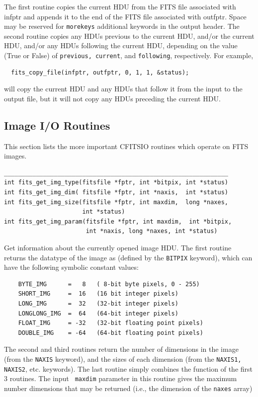 \documentclass[11pt]{article}
\begin{document}
The first routine copies the current HDU from the FITS file associated
with infptr and appends it to the end of the FITS file associated with
outfptr.  Space may be reserved for {\tt morekeys} additional keywords
in the output header.   The second routine copies any HDUs previous
to the current HDU, and/or the current HDU, and/or any HDUs following the
current HDU, depending on the value (True or False) of {\tt previous,
current}, and {\tt following}, respectively.  For example,
\begin{verbatim}
  fits_copy_file(infptr, outfptr, 0, 1, 1, &status);
\end{verbatim}
will copy the current HDU and any HDUs that follow it from the input
to the output file, but it will not copy any HDUs preceding the 
current HDU.


\newpage
\subsection{Image I/O Routines}

This section lists the more important CFITSIO routines which operate on
FITS images.

\begin{verbatim}
_______________________________________________________________
int fits_get_img_type(fitsfile *fptr, int *bitpix, int *status)
int fits_get_img_dim( fitsfile *fptr, int *naxis,  int *status)
int fits_get_img_size(fitsfile *fptr, int maxdim,  long *naxes,
                      int *status)
int fits_get_img_param(fitsfile *fptr, int maxdim,  int *bitpix,
                       int *naxis, long *naxes, int *status)
\end{verbatim}

Get information about the currently opened image HDU. The first routine
returns the datatype of the image as (defined by the {\tt BITPIX}
keyword), which can have the following symbolic constant values: 
\begin{verbatim}
    BYTE_IMG      =   8   ( 8-bit byte pixels, 0 - 255)
    SHORT_IMG     =  16   (16 bit integer pixels)
    LONG_IMG      =  32   (32-bit integer pixels)
    LONGLONG_IMG  =  64   (64-bit integer pixels)
    FLOAT_IMG     = -32   (32-bit floating point pixels)
    DOUBLE_IMG    = -64   (64-bit floating point pixels)
\end{verbatim}

The second and third routines return the number of dimensions in the
image (from the {\tt NAXIS} keyword), and the sizes of each dimension
(from the {\tt NAXIS1, NAXIS2}, etc. keywords).  The last routine
simply combines the function of the first 3 routines.  The input {\tt
maxdim} parameter in this routine gives the maximum number dimensions
that may be returned (i.e., the dimension of the {\tt naxes}
array)
\end{document}
